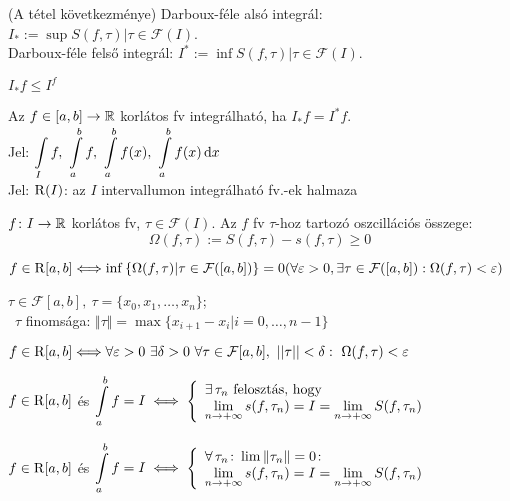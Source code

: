 \begin{de}(A tétel következménye)
  Darboux-féle alsó integrál: $I_*:=\sup{S(f,\tau)|\tau\in{\mathcal{F}(I)}}$.\\
  Darboux-féle felső integrál: $I^*:=\inf{S(f,\tau)|\tau\in{\mathcal{F}(I)}}$.
\end{de}
\begin{megj} $I_*f\leq I^f$
\end{megj}
\begin{de}
  Az $f\in [a,b]\to\mathbb{R}$ korlátos fv integrálható, ha $I_*f=I^*f$. \\
  Jel: $\di\Int_I{f},\ \Int_a^b{f},\ \Int_a^b{f(x)},\ \Int_a^b{f(x)\diff x}$\\
  Jel: $\operatorname{R}(I)$: az $I$ intervallumon integrálható fv.-ek halmaza
\end{de}
\begin{de}
  $f\colon I\to\mathbb{R}$ korlátos fv, $\tau\in{\mathcal{F}(I)}$. Az $f$ fv $\tau$-hoz tartozó oszcillációs
  összege:
  \[\Omega(f,\tau):=S(f,\tau)-s(f,\tau)\geq 0\]
\end{de}
\begin{te}
  $f\in{\operatorname{R}[a,b]}\Longleftrightarrow\inf{\{\Omega(f,\tau)|\tau\in{\mathcal{F}([a,b])}\}}=0\\
  (\forall\varepsilon>0,\exists\tau\in{\mathcal{F}([a,b])}:\Omega(f,\tau)<\varepsilon)$
\end{te}

\begin{de}
  $\tau\in{\mathcal{F}[a,b]},\ \tau=\{x_0,x_1,\dotsc,x_n\}$;\\\
  $\tau$ finomsága: $\Vert\tau\Vert=\max{\{x_{i+1}-x_i|i=0,\dotsc,n-1\}}$
\end{de}
\begin{te}
  $f\in{\Rint[a,b]}\ek\forall\epsilon>0\ \exists\delta>0\ \forall\tau\in{\mathcal{F}[a,b]},\ ||\tau||<\delta:\
  \Omega(f,\tau)<\epsilon$  
\end{te}
\begin{te}
  $f\in{\operatorname{R}[a,b]}$ és $\di\Int_a^bf = I \ekviv\left\{\begin{array}{l}\exists\, \tau_n\text{ felosztás, hogy }\\
  \lim\limits_{n\to+\infty}s(f,\tau_n)=I=\lim\limits_{n\to+\infty}S(f,\tau_n)\end{array}\right.$
\end{te}
\begin{te}
  $f\in{\operatorname{R}[a,b]}$ és $\di\Int_a^bf = I \ekviv\left\{\begin{array}{l} \forall\, \tau_n\colon
  \lim\Vert\tau_n\Vert=0\colon\\\lim\limits_{n\to+\infty}s(f,\tau_n)=I=
  \lim\limits_{n\to+\infty}S(f,\tau_n)\end{array}\right.$
\end{te}

